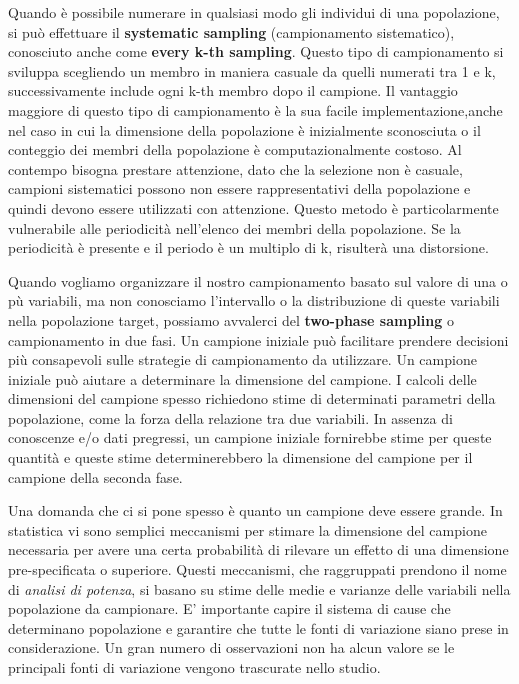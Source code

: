 \documentclass[a4paper]{extarticle}
\begin{document}
Quando è possibile numerare in qualsiasi modo gli individui di una popolazione, si può effettuare il \textbf{systematic sampling} (campionamento sistematico), conosciuto anche come \textbf{every k-th sampling}. Questo tipo di campionamento si sviluppa scegliendo un membro in maniera casuale da quelli numerati tra 1 e k, successivamente include ogni k-th membro dopo il campione.  Il vantaggio maggiore di questo tipo di campionamento è la sua facile implementazione,anche nel caso in cui la dimensione della popolazione è inizialmente sconosciuta o il conteggio dei membri della popolazione è computazionalmente costoso. Al contempo bisogna prestare attenzione, dato che la selezione non è casuale, campioni sistematici possono non essere rappresentativi della popolazione e quindi devono essere utilizzati con attenzione. Questo metodo è particolarmente vulnerabile alle periodicità nell'elenco dei membri della popolazione. Se la periodicità è presente e il periodo è un multiplo di k, risulterà una distorsione.

Quando vogliamo organizzare il nostro campionamento basato sul valore di una o pù variabili, ma non conosciamo l'intervallo o la distribuzione di queste variabili nella popolazione target, possiamo avvalerci del \textbf{two-phase sampling} o campionamento in due fasi. Un campione iniziale può facilitare prendere decisioni più consapevoli sulle strategie di campionamento da utilizzare.
Un campione iniziale può aiutare a determinare la dimensione del campione. I calcoli delle dimensioni del campione spesso richiedono stime di determinati parametri della popolazione, come la forza della relazione tra due variabili. In assenza di conoscenze e/o dati pregressi, un campione iniziale fornirebbe stime per queste quantità e queste stime determinerebbero la dimensione del campione per il campione della seconda fase.

Una domanda che ci si pone spesso è quanto un campione deve essere grande. In statistica vi sono semplici meccanismi per stimare la dimensione del campione necessaria per avere una certa probabilità di rilevare un effetto di una dimensione pre-specificata o superiore. Questi meccanismi, che raggruppati prendono il nome di \textit{analisi di potenza}, si basano su stime delle medie e varianze delle variabili nella popolazione da campionare. E' importante capire il sistema di cause che determinano popolazione e garantire che tutte le fonti di variazione siano prese in considerazione. Un gran numero di osservazioni non ha alcun valore se le principali fonti di variazione vengono trascurate nello studio.
\end{document}
